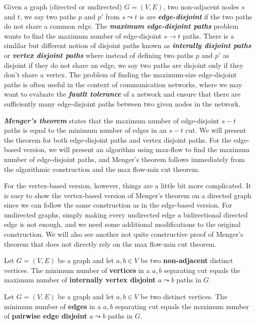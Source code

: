 Given a graph (directed or undirected) $G=(V,E)$, two non-adjacent nodes $s$ and $t$, we say two paths $p$ and $p'$ from $s \leadsto t$ is are \textit{\textbf{edge-disjoint}} if the two paths do not share a common edge. The \textit{\textbf{maximum edge-disjoint paths}} problem wants to find the maximum number of edge-disjoint $s \to t$ paths. There is a simlilar but different notion of disjoint paths known as \textit{\textbf{interally disjoint paths}} or \textit{\textbf{vertex disjoint paths}} where instead of defining two paths $p$ and $p'$ as disjoint if they do not share an edge, we say two paths are disjoint only if they don't share a vertex. The problem of finding the maximum-size edge-disjoint paths is often useful in the context of communication networks, where we may want to evaluate the \textit{\textbf{fautlt tolerance}} of a network and ensure that there are sufficiently many edge-disjoint paths between two given nodes in the network.

\textit{\textbf{Menger's theorem}} states that the maximum number of edge-disjoint $s-t$ paths is equal to the minimum number of edges in an $s-t$ cut. We will present the theorem for both edge-disjoint paths and vertex disjoint paths. For the edge-based version, we will present an algorithm using max-flow to find the maximum number of edge-disjoint paths, and Menger's theorem follows immediately from the algorithmic construction and the max flow-min cut theorem.

For the vertex-based version, however, things are a little bit more complicated. It is easy to show the vertex-based version of Menger's theorem on a directed graph since we can follow the same construction as in the edge-based version. For undirected graphs, simply making every undirected edge a bidirectional directed edge is not enough, and we need some additional modifications to the original construction. We will also see another not quite constructive proof of Menger's theorem that does not directly rely on the max flow-min cut theorem.

\begin{theorem} 
    Let $G=(V,E)$ be a graph and let $a,b \in V$ be two \textbf{non-adjacent} distinct vertices. The minimum number of \textbf{vertices} in a $a,b$ separating cut equals the maximum number of \textbf{internally vertex disjoint} $a \leadsto b$ paths in $G$.
\end{theorem}

\begin{theorem}
    Let $G=(V,E)$ be a graph and let $a,b \in V$ be two distinct vertices. The minimum number of \textbf{edges} in a $a,b$ separating cut equals the maximum number of \textbf{pairwise edge disjoint} $a \leadsto b$ paths in $G$.
\end{theorem}


